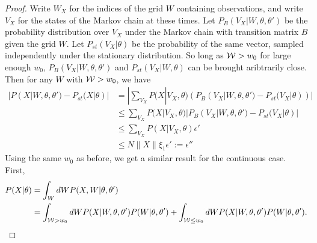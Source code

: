 \begin{proof}
Write $W_X$ for the indices of the grid $W$ containing observations, and write $V_X$
for the states of the Markov chain at these times.
Let $P_B(V_X | W, \theta, \theta')$ be the probability distribution over
$V_X$ under the Markov chain with transition matrix $B$ given the grid $W$.
Let $P_{st}(V_X|\theta)$ be the probability of the same vector, sampled
independently under the stationary distribution. So
long as ${\mathcal W} > w_{0}$ for large enough $w_0$,
$P_B(V_X | W, \theta, \theta')$ and  $P_{st}(V_X | W, \theta)$ can be
brought aribtrarily close.
Then for any $W$ with ${\mathcal W} > w_0$, we have
\begin{align*}
|P(X|W , \theta, \theta') - P_{st}(X | \theta)| &= | \sum_{V_X} P(X|V_X, \theta)(P_B(V_X | W, \theta, \theta') -  P_{st}(V_X | \theta))|\\
& \leq \sum_{V_X} P(X | V_X, \theta)|P_B(V_X | W, \theta, \theta') -  P_{st}(V_X | \theta)|\\
& \leq \sum_{V_X} P(X | V_X, \theta){\epsilon'}\\
& \leq N \| X \| \xi_1\epsilon' := \epsilon''
\end{align*}
Using the same $w_{0}$ as before, we get a similar result for the
continuous case. First,
\begin{align*}
P(X | \theta) &= \int_W dW P(X , W | \theta, \theta')\\
&= \int_{\mW > w_0} dW P(X | W, \theta, \theta') P(W | \theta, \theta') + \int_{\mW \leq w_0}dW P(X | W, \theta, \theta') P(W | \theta, \theta').

\end{align*}
\end{proof}
